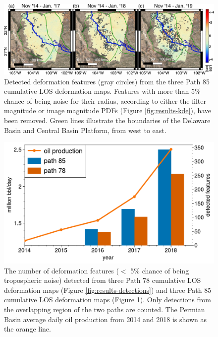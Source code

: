 \begin{figure}
	\centering 
	\includegraphics[width=0.98\linewidth]{figures/chapter6-blobs/figure_discussion_blobs_combined_path85.pdf}
	\caption[Detected deformation features for Path 85]{
		Detected deformation features (gray circles) from the three Path 85 cumulative LOS deformation maps. Features with more than 5\% chance of being noise for their radius, according to either the filter magnitude or image magnitude PDFs (Figure \ref{fig:results-kde}), have been removed. Green lines illustrate the boundaries of the Delaware Basin and Central Basin Platform, from west to east.
	}
	\label{fig:discussion-detections-85}
\end{figure}


\begin{figure}
	\centering 
	\includegraphics[width=.9\linewidth]{figures/chapter6-blobs/figure_discussion_oil_vs_blob_count_1col.pdf}
	\caption[Detected deformation features vs daily Permian Basin oil production]{
		The number of deformation features ($<$ 5\% chance of being tropospheric noise) detected from three Path 78 cumulative LOS deformation maps (Figure \ref{fig:results-detections}) and three Path 85 cumulative LOS deformation maps (Figure \ref{fig:discussion-detections-85}). Only detections from the overlapping region of the two paths are counted. The Permian Basin average daily oil production from 2014 and 2018 is shown as the orange line.
	}
	\label{fig:discussion-oil-blob-count}
\end{figure}
